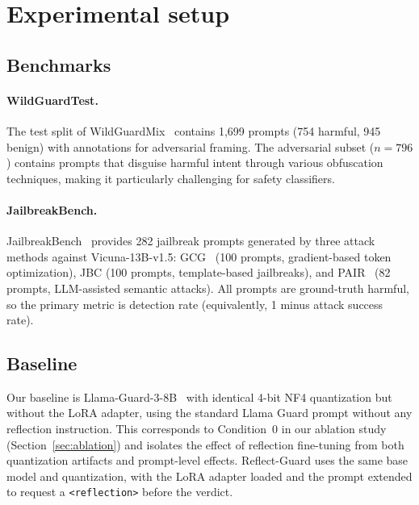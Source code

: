 \documentclass[11pt]{article}
\begin{document}
\section{Experimental setup}

\subsection{Benchmarks}

\paragraph{WildGuardTest.} The test split of WildGuardMix~\citep{han2024wildguard} contains 1{,}699 prompts (754 harmful, 945 benign) with annotations for adversarial framing. The adversarial subset ($n = 796$) contains prompts that disguise harmful intent through various obfuscation techniques, making it particularly challenging for safety classifiers.

\paragraph{JailbreakBench.} JailbreakBench~\citep{chao2024jailbreakbench} provides 282 jailbreak prompts generated by three attack methods against Vicuna-13B-v1.5: GCG~\citep{zou2023universal} (100 prompts, gradient-based token optimization), JBC (100 prompts, template-based jailbreaks), and PAIR~\citep{chao2023jailbreaking} (82 prompts, LLM-assisted semantic attacks). All prompts are ground-truth harmful, so the primary metric is detection rate (equivalently, 1 minus attack success rate).

\subsection{Baseline}

Our baseline is Llama-Guard-3-8B~\citep{metallamaguard3} with identical 4-bit NF4 quantization but without the LoRA adapter, using the standard Llama Guard prompt without any reflection instruction. This corresponds to Condition~0 in our ablation study (Section~\ref{sec:ablation}) and isolates the effect of reflection fine-tuning from both quantization artifacts and prompt-level effects. Reflect-Guard uses the same base model and quantization, with the LoRA adapter loaded and the prompt extended to request a \texttt{<reflection>} before the verdict.
\end{document}
